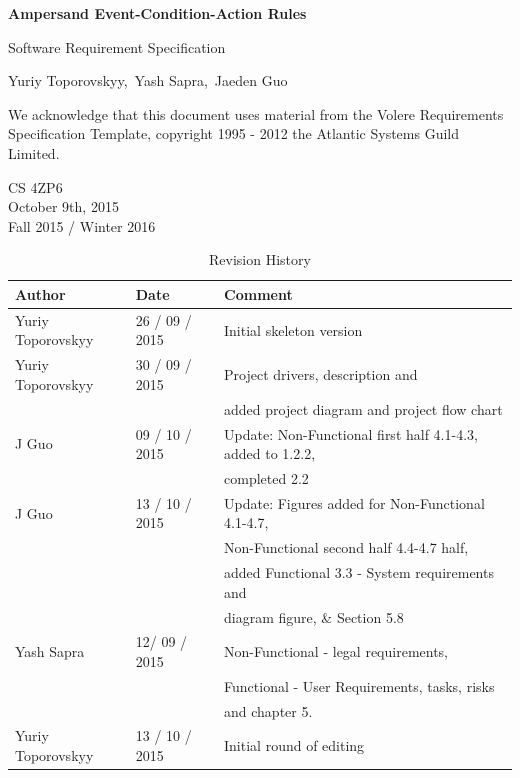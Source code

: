 \documentclass[12pt]{report}
\begin{document}
\begin{titlepage}\begin{center}
\thispagestyle{empty} %

\vspace*{1cm}

{\Huge\textbf{Ampersand Event-Condition-Action Rules}}

\vspace{0.5cm}
{\Large Software Requirement Specification 
	

\vspace{1.5cm}
Yuriy Toporovskyy,\ Yash Sapra,\ Jaeden Guo}
\vfill

We acknowledge that this document uses material from the Volere Requirements
Specification Template, copyright 1995 - 2012 the Atlantic Systems Guild
Limited.

\vspace{0.8cm}
\end{center}
CS 4ZP6 \\
October 9th, 2015 \\ 
Fall 2015 / Winter 2016 
\end{titlepage}


\begin{table}[ht!]\begin{center}
\caption{Revision History}  
\begin{tabular}{|l|l|l|}\hline
\textbf{Author} & \textbf{Date} & \textbf{Comment} \\\hline 
Yuriy Toporovskyy & 26 / 09 / 2015 & Initial skeleton version \\\hline
Yuriy Toporovskyy & 30 / 09 / 2015 & Project drivers, description and \\ & & 
added project diagram and project flow chart \\\hline
J Guo & 09 / 10 / 2015 & Update: Non-Functional first half 4.1-4.3, added to 
1.2.2, \\ & & completed 2.2 \\\hline
J Guo & 13 / 10 / 2015 & Update: Figures added for Non-Functional 4.1-4.7,  \\ 
& & 
Non-Functional second half 4.4-4.7 half, \\ & & added Functional 3.3 - System 
requirements  and \\ 
& & diagram figure, \& Section 5.8 \\\hline
Yash Sapra &  12/ 09 / 2015 & Non-Functional - legal requirements, \\ & & Functional - User 
Requirements, tasks, risks \\ & & and chapter 5.
\\\hline
Yuriy Toporovskyy & 13 / 10 / 2015 & Initial round of editing \\\hline
\end{tabular}
\end{center}\end{table}
\end{document}
